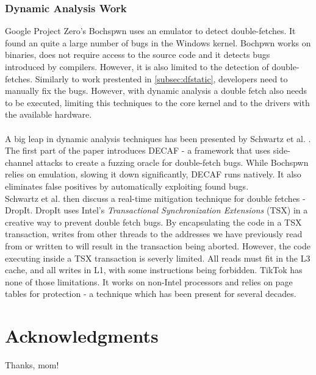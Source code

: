 \subsubsection{Dynamic Analysis Work}
Google Project Zero's Bochspwn \cite{jurczyk2013bochspwn} uses an emulator to
detect double-fetches. It found an quite a large number of bugs in the Windows
kernel. Bochpwn works on binaries, does not require access to the source code
and it detects bugs introduced by compilers. However, it is also limited to the
detection of double-fetches. Similarly to work prestented in 
\cref{subsec:dfstatic}, developers need to manually fix the bugs. However, with
dynamic analysis a double fetch also needs to be executed, limiting this
techniques to the core kernel and to the drivers with the available hardware.
\\
\\
A big leap in dynamic analysis techniques has been presented by Schwartz et al.
\cite{schwarz2018automated}. The first part of the paper introduces DECAF - a
framework that uses side-channel attacks to create a fuzzing oracle for
double-fetch bugs. While Bochspwn relies on emulation, slowing it down
significantly, DECAF runs natively. It also eliminates false positives by
automatically exploiting found bugs.
\\
Schwartz et al. then discuss a real-time mitigation technique for double
fetches - DropIt. DropIt uses Intel's \emph{Transactional Synchronization 
Extensions} (TSX)\cite{intel64and} in a creative way to prevent double fetch
bugs. By encapsulating the code in a TSX transaction, writes from other threads
to the addresses we have previously read from or written to will result in the
transaction being aborted. However, the code executing inside a TSX transaction
is severly limited. All reads must fit in the L3 cache, and all writes in L1,
with some instructions being forbidden. TikTok has none of those limitations.
It works on non-Intel processors and relies on page tables for protection - a
technique which has been present for several decades.


\section*{Acknowledgments}

Thanks, mom!

